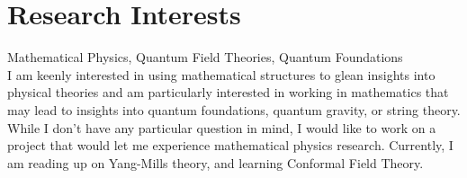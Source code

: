 \section{Research Interests}
\large
Mathematical Physics, Quantum Field Theories, Quantum Foundations\\
\small{
		I am keenly interested in using mathematical structures to glean insights into physical theories
		and am particularly interested in working in mathematics that may lead to insights into quantum foundations,
		quantum gravity, or string theory. 
		While I don't have any particular question in mind, I would like to work on 
		a project that would let me experience mathematical physics research. 
		Currently, I am reading up on Yang-Mills theory, and learning Conformal Field Theory.
	}
